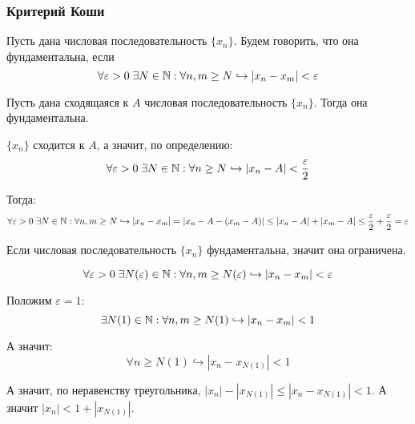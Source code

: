 \subsubsection{Критерий Коши}

\Def Пусть дана числовая последовательность $\{x_n\}$. Будем говорить, что она фундаментальна, если
\begin{equation*}
    \forall \varepsilon > 0 \; \exists N \in \mathbb{N}: \forall n, m \geq N \hookrightarrow |x_n - x_m| < \varepsilon
\end{equation*}

\Lemma Пусть дана сходящаяся к $A$ числовая последовательность $\{x_n\}$. Тогда она фундаментальна.

\Proof

$\{x_n\}$ сходится к $A$, а значит, по определению:
\begin{equation*}
    \forall \varepsilon > 0 \; \exists N \in \mathbb{N}: \forall n \geq N \hookrightarrow |x_n - A| < \frac{\varepsilon}{2}
\end{equation*}

Тогда:
\begin{equation*}
    \forall \varepsilon > 0 \; \exists N \in \mathbb{N}: \forall n, m \geq N \hookrightarrow |x_n - x_m| = |x_n - A - (x_m - A)| \leq |x_n - A| + |x_m - A| \leq \frac{\varepsilon}{2} + \frac{\varepsilon}{2} = \varepsilon
\end{equation*}

\Endproof

\Lemma Если числовая последовательность $\{x_n\}$ фундаментальна, значит она ограничена.

\Proof

\begin{equation*}
    \forall \varepsilon > 0 \; \exists N(\varepsilon) \in \mathbb{N}: \forall n, m \geq N(\varepsilon) \hookrightarrow |x_n - x_m| < \varepsilon
\end{equation*}

Положим $\varepsilon = 1$:
\begin{equation*}
    \exists N(1) \in \mathbb{N}: \forall n, m \geq N(1) \hookrightarrow |x_n - x_m| < 1
\end{equation*}

А значит:
\begin{equation*}
    \forall n \geq N(1) \hookrightarrow |x_n - x_{N(1)}| < 1
\end{equation*}

А значит, по неравенству треугольника, $|x_n| - |x_{N(1)}|  \leq |x_n - x_{N(1)}| < 1$. А значит $|x_n| < 1 + |x_{N(1)}|$.

